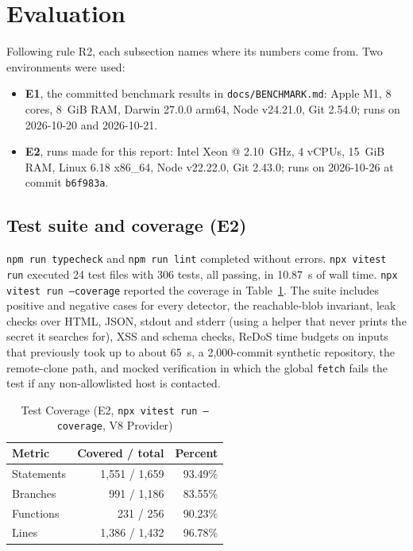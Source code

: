 \documentclass[conference]{IEEEtran}
\newcommand{\code}[1]{\texttt{#1}}
\begin{document}
\section{Evaluation}\label{sec:eval}

Following rule R2, each subsection names where its numbers come from. Two environments were used:
\begin{itemize}
\item \textbf{E1}, the committed benchmark results in \code{docs/BENCHMARK.md}: Apple M1, 8 cores,
  8~GiB RAM, Darwin 27.0.0 arm64, Node v24.21.0, Git 2.54.0; runs on 2026-10-20 and 2026-10-21.
\item \textbf{E2}, runs made for this report: Intel Xeon @ 2.10~GHz, 4 vCPUs, 15~GiB RAM,
  Linux 6.18 x86\_64, Node v22.22.0, Git 2.43.0; runs on 2026-10-26 at commit \code{b6f983a}.
\end{itemize}

\subsection{Test suite and coverage (E2)}
\code{npm run typecheck} and \code{npm run lint} completed without errors. \code{npx vitest run}
executed 24 test files with 306 tests, all passing, in 10.87~s of wall time.
\code{npx vitest run --coverage} reported the coverage in Table~\ref{tab:coverage}. The suite
includes positive and negative cases for every detector, the reachable-blob invariant, leak checks
over HTML, JSON, stdout and stderr (using a helper that never prints the secret it searches for),
XSS and schema checks, ReDoS time budgets on inputs that previously took up to about 65~s, a
2{,}000-commit synthetic repository, the remote-clone path, and mocked verification in which the
global \code{fetch} fails the test if any non-allowlisted host is contacted.

\begin{table}[t]
\centering
\caption{Test Coverage (E2, \code{npx vitest run --coverage}, V8 Provider)}
\label{tab:coverage}
\footnotesize
\begin{tabular}{@{}lrr@{}}
\toprule
Metric & Covered / total & Percent \\
\midrule
Statements & 1{,}551 / 1{,}659 & 93.49\% \\
Branches & 991 / 1{,}186 & 83.55\% \\
Functions & 231 / 256 & 90.23\% \\
Lines & 1{,}386 / 1{,}432 & 96.78\% \\
\bottomrule
\end{tabular}
\end{table}
\end{document}
